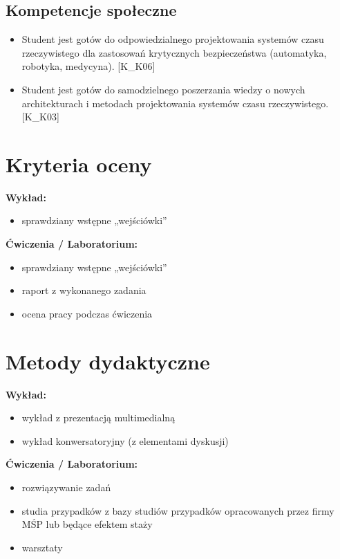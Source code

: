 \documentclass[12pt, a4paper]{article}
\begin{document}
\subsection*{Kompetencje społeczne}
\begin{itemize}
  \item Student jest gotów do odpowiedzialnego projektowania systemów czasu rzeczywistego dla zastosowań krytycznych bezpieczeństwa (automatyka, robotyka, medycyna). [K\_K06]
  \item Student jest gotów do samodzielnego poszerzania wiedzy o nowych architekturach i metodach projektowania systemów czasu rzeczywistego. [K\_K03]
\end{itemize}

\section{Kryteria oceny}

\textbf{Wykład:}
\begin{itemize}
  \item sprawdziany wstępne „wejściówki''
\end{itemize}
\vspace{4pt}
\textbf{Ćwiczenia / Laboratorium:}
\begin{itemize}
  \item sprawdziany wstępne „wejściówki''
  \item raport z wykonanego zadania
  \item ocena pracy podczas ćwiczenia
\end{itemize}


\section{Metody dydaktyczne}

\textbf{Wykład:}
\begin{itemize}
  \item wykład z prezentacją multimedialną
  \item wykład konwersatoryjny (z elementami dyskusji)
\end{itemize}
\vspace{4pt}
\textbf{Ćwiczenia / Laboratorium:}
\begin{itemize}
  \item rozwiązywanie zadań
  \item studia przypadków z bazy studiów przypadków opracowanych przez firmy MŚP lub będące efektem staży
  \item warsztaty
\end{itemize}
\vspace{4pt}
\end{document}
